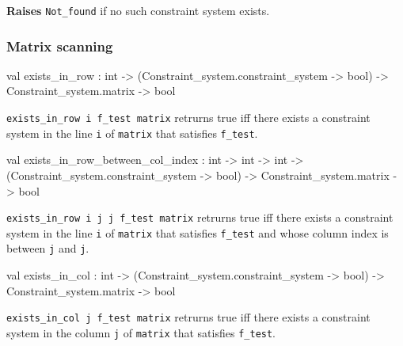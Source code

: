 \begin{ocamldocsigend}
\begin{ocamldocdescription}
{\bf Raises} {\tt{Not\_found}} if no such constraint system exists.


\end{ocamldocdescription}


\subsubsection{Matrix scanning}


\label{val:Constraint-underscoresystem.Matrix.exists-underscorein-underscorerow}\begin{ocamldoccode}
val exists_in_row :
  int ->
  (Constraint_system.constraint_system -> bool) ->
  Constraint_system.matrix -> bool
\end{ocamldoccode}
\begin{ocamldocdescription}
{\tt{exists\_in\_row i f\_test matrix}} retrurns true iff there exists a constraint system in the line {\tt{i}} of {\tt{matrix}} that satisfies {\tt{f\_test}}.


\end{ocamldocdescription}


\label{val:Constraint-underscoresystem.Matrix.exists-underscorein-underscorerow-underscorebetween-underscorecol-underscoreindex}\begin{ocamldoccode}
val exists_in_row_between_col_index :
  int ->
  int ->
  int ->
  (Constraint_system.constraint_system -> bool) ->
  Constraint_system.matrix -> bool
\end{ocamldoccode}
\begin{ocamldocdescription}
{\tt{exists\_in\_row i j j{\textquotesingle} f\_test matrix}} retrurns true iff there exists a constraint system in the line {\tt{i}} of {\tt{matrix}} that satisfies {\tt{f\_test}}
    and whose column index is between {\tt{j}} and {\tt{j{\textquotesingle}}}.


\end{ocamldocdescription}


\label{val:Constraint-underscoresystem.Matrix.exists-underscorein-underscorecol}\begin{ocamldoccode}
val exists_in_col :
  int ->
  (Constraint_system.constraint_system -> bool) ->
  Constraint_system.matrix -> bool
\end{ocamldoccode}
\begin{ocamldocdescription}
{\tt{exists\_in\_col j f\_test matrix}} retrurns true iff there exists a constraint system in the column {\tt{j}} of {\tt{matrix}} that satisfies {\tt{f\_test}}.



\end{ocamldocdescription}
\end{ocamldocsigend}
